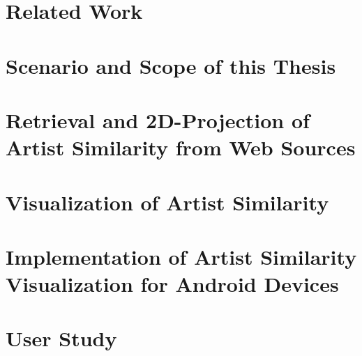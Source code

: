 \documentclass[a4paper,11pt,twoside]{memoir}
\begin{document}


\chapter{Related Work}
\label{ch:relatedwork}



\chapter{Scenario and Scope of this Thesis}
\label{ch:scenario}



\chapter{Retrieval and 2D-Projection of Artist Similarity from Web Sources}
\label{ch:computation}



\chapter{Visualization of Artist Similarity}
\label{ch:visualization}



\chapter{Implementation of Artist Similarity Visualization for Android Devices}
\label{ch:implementation}



\chapter{User Study}
\label{ch:userstudy}


\end{document}
